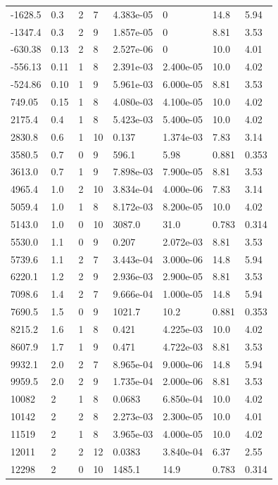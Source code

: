 \documentclass[preview]{standalone}
\begin{document}
{{\begin{tabular}{L{1.2cm}C{1.2cm} C{0.3cm}C{0.5cm} C{1.4cm}C{1.4cm} C{1.4cm}C{1.4cm}}
  -1628.5  &   0.3  & 2     &  7 &  4.383e-05  & 0  & 14.8 &  5.94   \\ 
  -1347.4  &   0.3  & 2     &  9 &  1.857e-05  & 0  & 8.81 &  3.53   \\ 
  -630.38  &  0.13  & 2     &  8 &  2.527e-06  & 0  & 10.0 &  4.01   \\ 
  -556.13  &  0.11  & 1     &  8 &  2.391e-03  & 2.400e-05  & 10.0 &  4.02   \\ 
  -524.86  &  0.10  & 1     &  9 &  5.961e-03  & 6.000e-05  & 8.81 &  3.53   \\ 
  749.05  &  0.15  & 1     &  8 &  4.080e-03  & 4.100e-05  & 10.0 &  4.02   \\ 
  2175.4  &   0.4  & 1     &  8 &  5.423e-03  & 5.400e-05  & 10.0 &  4.02   \\ 
  2830.8  &   0.6  & 1     & 10 &  0.137  & 1.374e-03  & 7.83 &  3.14   \\ 
  3580.5  &   0.7  & 0     &  9 &  596.1  & 5.98  & 0.881 &  0.353   \\ 
  3613.0  &   0.7  & 1     &  9 &  7.898e-03  & 7.900e-05  & 8.81 &  3.53   \\ 
  4965.4  &   1.0  & 2     & 10 &  3.834e-04  & 4.000e-06  & 7.83 &  3.14   \\ 
  5059.4  &   1.0  & 1     &  8 &  8.172e-03  & 8.200e-05  & 10.0 &  4.02   \\ 
  5143.0  &   1.0  & 0     & 10 &  3087.0  & 31.0  & 0.783 &  0.314   \\ 
  5530.0  &   1.1  & 0     &  9 &  0.207  & 2.072e-03  & 8.81 &  3.53   \\ 
  5739.6  &   1.1  & 2     &  7 &  3.443e-04  & 3.000e-06  & 14.8 &  5.94   \\ 
  6220.1  &   1.2  & 2     &  9 &  2.936e-03  & 2.900e-05  & 8.81 &  3.53   \\ 
  7098.6  &   1.4  & 2     &  7 &  9.666e-04  & 1.000e-05  & 14.8 &  5.94   \\ 
  7690.5  &   1.5  & 0     &  9 &  1021.7  & 10.2  & 0.881 &  0.353   \\ 
  8215.2  &   1.6  & 1     &  8 &  0.421  & 4.225e-03  & 10.0 &  4.02   \\ 
  8607.9  &   1.7  & 1     &  9 &  0.471  & 4.722e-03  & 8.81 &  3.53   \\ 
  9932.1  &   2.0  & 2     &  7 &  8.965e-04  & 9.000e-06  & 14.8 &  5.94   \\ 
  9959.5  &   2.0  & 2     &  9 &  1.735e-04  & 2.000e-06  & 8.81 &  3.53   \\ 
  10082  &     2  & 1     &  8 &  0.0683  & 6.850e-04  & 10.0 &  4.02   \\ 
  10142  &     2  & 2     &  8 &  2.273e-03  & 2.300e-05  & 10.0 &  4.01   \\ 
  11519  &     2  & 1     &  8 &  3.965e-03  & 4.000e-05  & 10.0 &  4.02   \\ 
  12011  &     2  & 2     & 12 &  0.0383  & 3.840e-04  & 6.37 &  2.55   \\ 
  12298  &     2  & 0     & 10 &  1485.1  & 14.9  & 0.783 &  0.314   \\ 
\hline 
\end{tabular} 

}}
\end{document}
